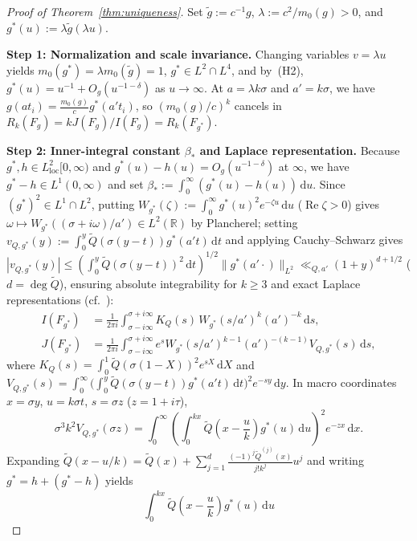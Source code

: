 \documentclass[11pt, reqno]{amsart}
\theoremstyle{remark}
\numberwithin{equation}{section}
\DeclareMathOperator{\re}{Re}
\newcommand{\R}{\mathbb{R}}
\newcommand{\dd}{\,\mathrm{d}}
\begin{document}
\begin{proof}[Proof of Theorem~\ref{thm:uniqueness}]
Set $\tilde{g} := c^{-1} g$, $\lambda := c^2 / m_0(g) > 0$, and $g^*(u) := \lambda \tilde{g}(\lambda u)$.

\smallskip
\noindent\textbf{Step 1: Normalization and scale invariance.}
Changing variables $v = \lambda u$ yields $m_0(g^*) = \lambda m_0(\tilde{g}) = 1$, $g^* \in L^2 \cap L^4$,
and by~(H2), $g^*(u) = u^{-1} + O_g(u^{-1-\delta})$ as $u \to \infty$. At $a = \lambda k\sigma$
and $a' = k\sigma$, we have $g(a t_i) = \frac{m_0(g)}{c} g^*(a' t_i)$, so $(m_0(g)/c)^k$ cancels
in $R_k(F_g) = k J(F_g)/I(F_g) = R_k(F_{g^*})$.

\smallskip
\noindent\textbf{Step 2: Inner-integral constant $\beta_*$ and Laplace representation.}
Because $g^*, h \in L^2_{\mathrm{loc}}[0,\infty)$ and $g^*(u) - h(u) = O_g(u^{-1-\delta})$ at $\infty$,
we have $g^* - h \in L^1(0,\infty)$ and set $\beta_* := \int_0^\infty (g^*(u) - h(u))\dd u$.
Since $(g^*)^2 \in L^1 \cap L^2$, putting $W_{g^*}(\zeta) := \int_0^\infty g^*(u)^2 e^{-\zeta u}\dd u$
($\re\zeta > 0$) gives $\omega \mapsto W_{g^*}((\sigma+i\omega)/a') \in L^2(\R)$ by Plancherel;
setting $v_{Q,g^*}(y) := \int_0^y \widetilde{Q}(\sigma(y-t)) g^*(a' t)\dd t$ and applying
Cauchy--Schwarz gives $|v_{Q,g^*}(y)| \le (\int_0^y \widetilde{Q}(\sigma(y-t))^2\dd t)^{1/2}\|g^*(a'\cdot)\|_{L^2}
\ll_{Q, a'} (1+y)^{d+1/2}$ ($d = \deg\widetilde{Q}$), ensuring absolute
integrability for $k \ge 3$ and exact Laplace representations (cf.\ \cite[Theorem~4]{Lewulis}):
\begin{align*}
I(F_{g^*}) &= \frac{1}{2\pi i}\int_{\sigma-i\infty}^{\sigma+i\infty} K_Q(s)\, W_{g^*}(s/a')^k (a')^{-k}\dd s, \\
J(F_{g^*}) &= \frac{1}{2\pi i}\int_{\sigma-i\infty}^{\sigma+i\infty} e^s W_{g^*}(s/a')^{k-1}(a')^{-(k-1)} V_{Q,g^*}(s)\dd s,
\end{align*}
where $K_Q(s) = \int_0^1 \widetilde{Q}(\sigma(1-X))^2 e^{sX}\dd X$ and
$V_{Q,g^*}(s) = \int_0^\infty \bigl(\int_0^y \widetilde{Q}(\sigma(y-t)) g^*(a' t)\dd t\bigr)^2 e^{-sy}\dd y$.
In macro coordinates $x = \sigma y$, $u = k\sigma t$, $s = \sigma z$ ($z = 1+i\tau$),
\[
\sigma^3 k^2 V_{Q, g^*}(\sigma z)
= \int_0^\infty \left(\int_0^{kx} \widetilde{Q}\!\left(x - \frac{u}{k}\right) g^*(u)\dd u\right)^{\!2} e^{-zx}\dd x.
\]
Expanding $\widetilde{Q}(x-u/k) = \widetilde{Q}(x) + \sum_{j=1}^d \frac{(-1)^j \widetilde{Q}^{(j)}(x)}{j! k^j} u^j$
and writing $g^* = h + (g^* - h)$ yields
\[
\int_0^{kx} \widetilde{Q}\!\left(x - \frac{u}{k}\right) g^*(u)\dd u
\]
\end{proof}
\end{document}
